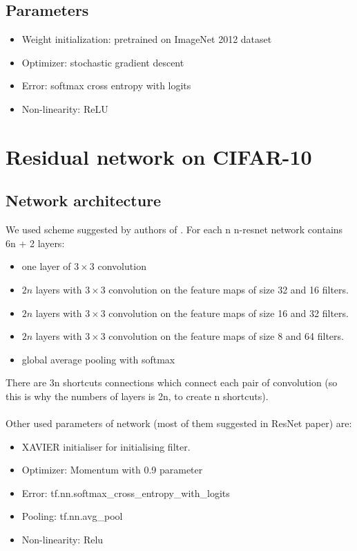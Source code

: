 \documentclass[licencjacka]{pracamgr}
\begin{document}
		\subsection{Parameters}
			\begin{itemize}
			\item Weight initialization: pretrained on ImageNet 2012 dataset
			\item Optimizer: stochastic gradient descent
			\item Error: softmax cross entropy with logits
			\item Non-linearity: ReLU
			\end{itemize}
	\section{Residual network on CIFAR-10}
		\subsection{Network architecture}
			We used scheme suggested by authors of \cite{resnet}. For each n n-resnet network contains 6n + 2 layers:
			\begin{itemize}
			\item one layer of $3 \times 3$ convolution
			\item $2n$ layers with $3 \times 3$ convolution on the feature maps of size 32 and 16 filters.
			\item $2n$ layers with $3 \times 3$ convolution on the feature maps of size 16 and 32 filters.
			\item $2n$ layers with $3 \times 3$ convolution on the feature maps of size 8 and 64 filters.
			\item global average pooling with softmax
			\end{itemize}

			There are 3n shortcuts connections which connect each pair of convolution (so this is why the numbers of layers is 2n, to create n shortcuts).\\\\

			Other used parameters of network (most of them suggested in ResNet paper) are:
			\begin{itemize}
			\item XAVIER initialiser for initialising filter.
			\item Optimizer: Momentum with 0.9 parameter
			\item Error: tf.nn.softmax\_cross\_entropy\_with\_logits
			\item Pooling: tf.nn.avg\_pool
			\item Non-linearity: Relu
			\end{itemize}
\end{document}
